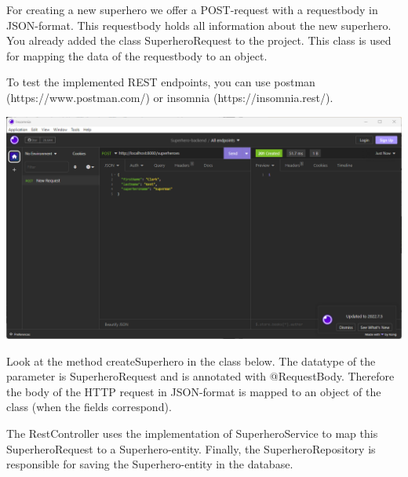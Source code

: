 For creating a new superhero we offer a POST-request with a requestbody in JSON-format. This requestbody holds all information about the new superhero.  You already added the class SuperheroRequest to the project. This class is used for mapping the data of the requestbody to an object.

To test the implemented REST endpoints,  you can use postman (https://www.postman.com/) or insomnia (https://insomnia.rest/). 

\includegraphics[width=\textwidth]{./images/chapter2/post-request-insomnia.png} 

Look at the method createSuperhero in the class below. The datatype of the parameter is SuperheroRequest and is annotated with @RequestBody.  Therefore the body of the HTTP request in JSON-format is mapped to an object of the class (when the fields correspond). 

The RestController uses the implementation of SuperheroService to map this SuperheroRequest to a Superhero-entity. Finally, the SuperheroRepository is responsible for saving the Superhero-entity in the database. 


